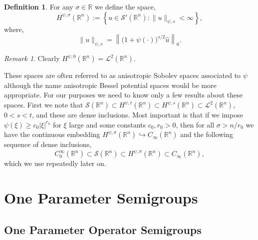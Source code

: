 \documentclass[a4paper, 12pt]{report}
\theoremstyle{cor}
\theoremstyle{remark}
\newtheorem{remark}[theorem]{Remark}
\theoremstyle{definition}
\newtheorem{defn}[theorem]{Definition}
\begin{document}
\begin{defn}
For any $\sigma \in \mathbb{R}$ we define the space,
\begin{equation}
H^{\psi, \sigma}(\mathbb{R}^n) := \left\{u \in \mathcal{S}'(\mathbb{R}^n) : \|u\|_{\psi, s} < \infty\right\},
\end{equation}
where,
\begin{equation}
\|u\|_{\psi, s} = \left\|\big(1 + \psi(\cdot)\big)^{s/2}\hat{u}\right\|_0.
\end{equation}
\end{defn}
\begin{remark}
Clearly $H^{\psi, 0}(\mathbb{R}^n) = \mathcal{L}^2(\mathbb{R}^n)$.
\end{remark}
These spaces are often referred to as anisotropic Sobolev spaces associated to $\psi$ although the name anisotropic Bessel potential spaces would be more appropriate.
For our purposes we need to know only a few results about these spaces.  First we note that $\mathcal{S}(\mathbb{R}^n) \subset H^{\psi, t}(\mathbb{R}^n) \subset H^{\psi, s}(\mathbb{R}^n) \subset \mathcal{L}^2(\mathbb{R}^n)$, $0 < s < t$, and these are dense inclusions.  Most important is that if we impose $\psi(\xi) \ge c_0|\xi|^{r_0}$ for $\xi$ large and some constants $c_0, r_0 > 0$, then for all $\sigma > n/r_0$ we have the continuous embedding $H^{\psi, \sigma}(\mathbb{R}^n) \hookrightarrow C_\infty(\mathbb{R}^n)$ and the following sequence of dense inclusions,
$$
C_0^\infty(\mathbb{R}^n) \subset \mathcal{S}(\mathbb{R}^n) \subset H^{\psi, \sigma}(\mathbb{R}^n) \subset C_\infty(\mathbb{R}^n),
$$
which we use repeatedly later on.


\chapter{One Parameter Semigroups}\label{Ch.oOPS}

\section{One Parameter Operator Semigroups}\label{Se.OPOS}
\end{document}
